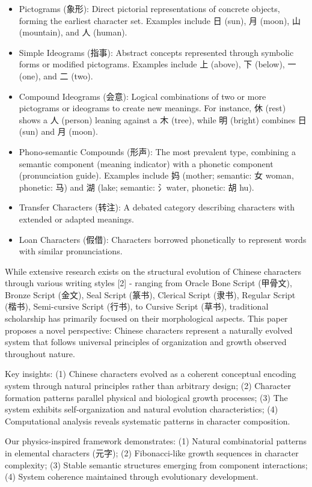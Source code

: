 \documentclass[
  11pt,
  letterpaper,
]{article}
\begin{document}
\begin{itemize}
\item
  Pictograms (象形): Direct pictorial representations of concrete
  objects, forming the earliest character set. Examples include 日
  (sun), 月 (moon), 山 (mountain), and 人 (human).
\item
  Simple Ideograms (指事): Abstract concepts represented through
  symbolic forms or modified pictograms. Examples include 上 (above), 下
  (below), 一 (one), and 二 (two).
\item
  Compound Ideograms (会意): Logical combinations of two or more
  pictograms or ideograms to create new meanings. For instance, 休
  (rest) shows a 人 (person) leaning against a 木 (tree), while 明
  (bright) combines 日 (sun) and 月 (moon).
\item
  Phono-semantic Compounds (形声): The most prevalent type, combining a
  semantic component (meaning indicator) with a phonetic component
  (pronunciation guide). Examples include 妈 (mother; semantic: 女
  woman, phonetic: 马) and 湖 (lake; semantic: 氵water, phonetic: 胡
  hu).
\item
  Transfer Characters (转注): A debated category describing characters
  with extended or adapted meanings.
\item
  Loan Characters (假借): Characters borrowed phonetically to represent
  words with similar pronunciations.
\end{itemize}

While extensive research exists on the structural evolution of Chinese
characters through various writing styles {[}2{]} - ranging from Oracle
Bone Script (甲骨文), Bronze Script (金文), Seal Script (篆书), Clerical
Script (隶书), Regular Script (楷书), Semi-cursive Script (行书), to
Cursive Script (草书), traditional scholarship has primarily focused on
their morphological aspects. This paper proposes a novel perspective:
Chinese characters represent a naturally evolved system that follows
universal principles of organization and growth observed throughout
nature.

Key insights: (1) Chinese characters evolved as a coherent conceptual
encoding system through natural principles rather than arbitrary design;
(2) Character formation patterns parallel physical and biological growth
processes; (3) The system exhibits self-organization and natural
evolution characteristics; (4) Computational analysis reveals systematic
patterns in character composition.

Our physics-inspired framework demonstrates: (1) Natural combinatorial
patterns in elemental characters (元字); (2) Fibonacci-like growth
sequences in character complexity; (3) Stable semantic structures
emerging from component interactions; (4) System coherence maintained
through evolutionary development.
\end{document}
